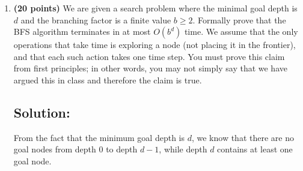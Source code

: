 \documentclass[11pt]{article}
\begin{document}
\begin{enumerate}[leftmargin=*, label=\textbf{\arabic*.}]
\subsection*{Solution:}

\textbf{a)}

A boolean satisfiability problem is given by a set of variables $x_1, x_2, x_3, \dots, x_n$.

We can write a state as an n-tuple:
\[s = (v_1, v_2, v_3, \dots, v_n) \qquad \text{ where } v_i \in \{true, false, unspecified\}\]

\textbf{b)}

Initial State:
\[s_0 = (unspecified, unspecified, unspecified, \dots, unspecified) \qquad |s_0| = n\]

Goal State:
\[s = (v_1, v_2, v_3, \dots, v_n) \qquad \text{ where } v_i \in \{true, false\}\]

and this assignment satisfies $\phi.$

\textbf{c)}

Action:
\[Assign(x_i, b) \qquad \text{ where } x_i \text{ is unspecified and } b \in  \{true, false\}\]

Transition model:
\[T(s, Assign(x_i, b)) = (v_1, v_2, v_3, \dots,v_{i - 1} ,b , v_{i + 1}, \dots, v_n)\]

\textbf{d)}

For each variable, we have \{true, flase, unspecified\}

Search Space:
\[3^n\]

\newpage

\item \textbf{(20 points)} We are given a search problem where the minimal goal depth is $d$ and the branching factor is a finite value $b\ge 2$. Formally prove that the BFS algorithm terminates in at most $O(b^d)$ time. We assume that the only operations that take time is exploring a node (not placing it in the frontier), and that each such action takes one time step. You must prove this claim from first principles; in other words, you may not simply say that we have argued this in class and therefore the claim is true.

\subsection*{Solution:}

From the fact that the minimum goal depth is $d$, we know that there are no goal nodes from depth $0$ to depth $d-1$, while depth $d$ contains at least one goal node.


\end{enumerate}
\end{document}
